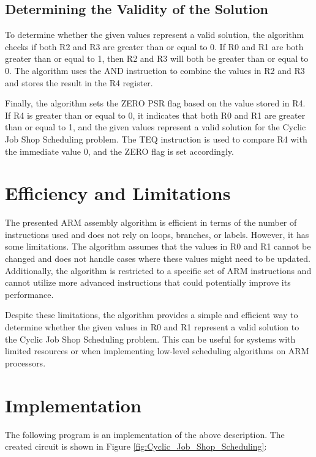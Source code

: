 \subsection{Determining the Validity of the Solution}

To determine whether the given values represent a valid solution, the algorithm checks if both R2 and R3 are greater than or equal to 0. If R0 and R1 are both greater than or equal to 1, then R2 and R3 will both be greater than or equal to 0. The algorithm uses the AND instruction to combine the values in R2 and R3 and stores the result in the R4 register.

Finally, the algorithm sets the ZERO PSR flag based on the value stored in R4. If R4 is greater than or equal to 0, it indicates that both R0 and R1 are greater than or equal to 1, and the given values represent a valid solution for the Cyclic Job Shop Scheduling problem. The TEQ instruction is used to compare R4 with the immediate value 0, and the ZERO flag is set accordingly.

\section{Efficiency and Limitations}

The presented ARM assembly algorithm is efficient in terms of the number of instructions used and does not rely on loops, branches, or labels. However, it has some limitations. The algorithm assumes that the values in R0 and R1 cannot be changed and does not handle cases where these values might need to be updated. Additionally, the algorithm is restricted to a specific set of ARM instructions and cannot utilize more advanced instructions that could potentially improve its performance.

Despite these limitations, the algorithm provides a simple and efficient way to determine whether the given values in R0 and R1 represent a valid solution to the Cyclic Job Shop Scheduling problem. This can be useful for systems with limited resources or when implementing low-level scheduling algorithms on ARM processors.



\section{Implementation}

The following program is an implementation of the above description. The created circuit is shown in Figure \ref{fig:Cyclic_Job_Shop_Scheduling}:

